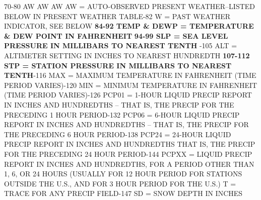 70-80   AW AW AW AW = AUTO-OBSERVED PRESENT WEATHER--LISTED BELOW IN PRESENT WEATHER TABLE-82   W = PAST WEATHER INDICATOR, SEE BELOW\newline
\textbf{84-92   TEMP \& DEWP = TEMPERATURE \& DEW POINT IN FAHRENHEIT} \newline
\textbf{94-99   SLP = SEA LEVEL PRESSURE IN MILLIBARS TO NEAREST TENTH} -105   ALT = ALTIMETER SETTING IN INCHES TO NEAREST HUNDREDTH \newline
\textbf{107-112   STP = STATION PRESSURE IN MILLIBARS TO NEAREST TENTH}-116  MAX = MAXIMUM TEMPERATURE IN FAHRENHEIT (TIME PERIOD VARIES)-120 MIN = MINIMUM TEMPERATURE IN FAHRENHEIT (TIME PERIOD VARIES)-126 PCP01 = 1-HOUR LIQUID PRECIP REPORT IN INCHES AND HUNDREDTHS --
        THAT IS, THE PRECIP FOR THE PRECEDING 1 HOUR PERIOD-132 PCP06 = 6-HOUR LIQUID PRECIP REPORT IN INCHES AND HUNDREDTHS --
        THAT IS, THE PRECIP FOR THE PRECEDING 6 HOUR PERIOD-138 PCP24 = 24-HOUR LIQUID PRECIP REPORT IN INCHES AND HUNDREDTHS
        THAT IS, THE PRECIP FOR THE PRECEDING 24 HOUR PERIOD-144 PCPXX = LIQUID PRECIP REPORT IN INCHES AND HUNDREDTHS, FOR
        A PERIOD OTHER THAN 1, 6, OR 24 HOURS (USUALLY FOR 12 HOUR PERIOD
        FOR STATIONS OUTSIDE THE U.S., AND FOR 3 HOUR PERIOD FOR THE U.S.)
        T = TRACE FOR ANY PRECIP FIELD-147 SD = SNOW DEPTH IN INCHES \newline